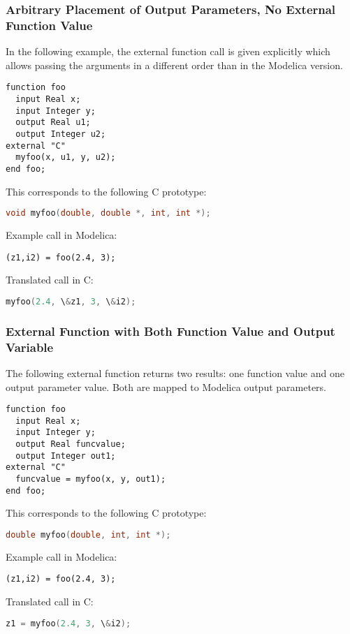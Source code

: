 \subsubsection{Arbitrary Placement of Output Parameters, No External Function Value}\label{arbitrary-placement-of-output-parameters-no-external-function-value}

\begin{example}
In the following example, the external function call is given
explicitly which allows passing the arguments in a different order than
in the Modelica version.
\begin{lstlisting}[language=modelica]
function foo
  input Real x;
  input Integer y;
  output Real u1;
  output Integer u2;
external "C"
  myfoo(x, u1, y, u2);
end foo;
\end{lstlisting}
This corresponds to the following C prototype:
\begin{lstlisting}[language=C]
void myfoo(double, double *, int, int *);
\end{lstlisting}
Example call in Modelica:
\begin{lstlisting}[language=modelica]
(z1,i2) = foo(2.4, 3);
\end{lstlisting}
Translated call in C:
\begin{lstlisting}[language=C]
myfoo(2.4, \&z1, 3, \&i2);
\end{lstlisting}
\end{example}

\subsubsection{External Function with Both Function Value and Output Variable}\label{external-function-with-both-function-value-and-output-variable}

\begin{example}
The following external function returns two results: one
function value and one output parameter value. Both are mapped to
Modelica output parameters.
\begin{lstlisting}[language=modelica]
function foo
  input Real x;
  input Integer y;
  output Real funcvalue;
  output Integer out1;
external "C"
  funcvalue = myfoo(x, y, out1);
end foo;
\end{lstlisting}
This corresponds to the following C prototype:
\begin{lstlisting}[language=C]
double myfoo(double, int, int *);
\end{lstlisting}
Example call in Modelica:
\begin{lstlisting}[language=modelica]
(z1,i2) = foo(2.4, 3);
\end{lstlisting}
Translated call in C:
\begin{lstlisting}[language=C]
z1 = myfoo(2.4, 3, \&i2);
\end{lstlisting}
\end{example}

